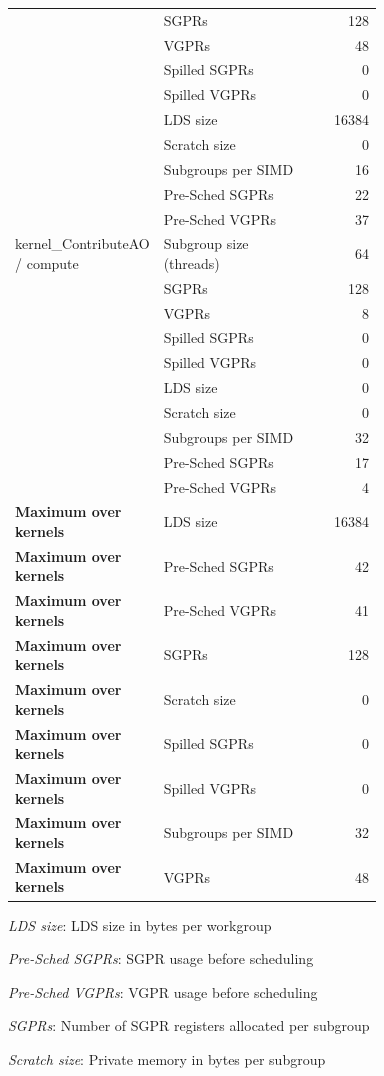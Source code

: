 \begin{longtable}{p{0.30\linewidth}p{0.43\linewidth}r}
 & SGPRs & 128 \\
 & VGPRs & 48 \\
 & Spilled SGPRs & 0 \\
 & Spilled VGPRs & 0 \\
 & LDS size & 16384 \\
 & Scratch size & 0 \\
 & Subgroups per SIMD & 16 \\
 & Pre-Sched SGPRs & 22 \\
 & Pre-Sched VGPRs & 37 \\
\hline
kernel\_ContributeAO / compute & Subgroup size (threads) & 64 \\
 & SGPRs & 128 \\
 & VGPRs & 8 \\
 & Spilled SGPRs & 0 \\
 & Spilled VGPRs & 0 \\
 & LDS size & 0 \\
 & Scratch size & 0 \\
 & Subgroups per SIMD & 32 \\
 & Pre-Sched SGPRs & 17 \\
 & Pre-Sched VGPRs & 4 \\
\hline
\textbf{Maximum over kernels} & LDS size & 16384 \\
\textbf{Maximum over kernels} & Pre-Sched SGPRs & 42 \\
\textbf{Maximum over kernels} & Pre-Sched VGPRs & 41 \\
\textbf{Maximum over kernels} & SGPRs & 128 \\
\textbf{Maximum over kernels} & Scratch size & 0 \\
\textbf{Maximum over kernels} & Spilled SGPRs & 0 \\
\textbf{Maximum over kernels} & Spilled VGPRs & 0 \\
\textbf{Maximum over kernels} & Subgroups per SIMD & 32 \\
\textbf{Maximum over kernels} & VGPRs & 48 \\
\hline
\end{longtable}
\noindent\textit{LDS size}: LDS size in bytes per workgroup\par
\noindent\textit{Pre-Sched SGPRs}: SGPR usage before scheduling\par
\noindent\textit{Pre-Sched VGPRs}: VGPR usage before scheduling\par
\noindent\textit{SGPRs}: Number of SGPR registers allocated per subgroup\par
\noindent\textit{Scratch size}: Private memory in bytes per subgroup\par
